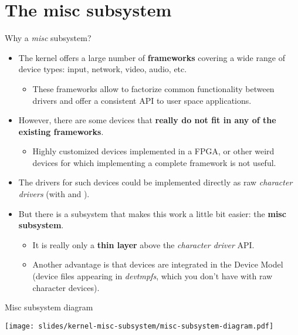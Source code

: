 \section{The misc subsystem}

\begin{frame}{Why a {\em misc} subsystem?}
  \begin{itemize}
  \item The kernel offers a large number of {\bf frameworks} covering
    a wide range of device types: input, network, video, audio,
    etc.
    \begin{itemize}
    \item These frameworks allow to factorize common functionality
      between drivers and offer a consistent API to user space
      applications.
    \end{itemize}
  \item However, there are some devices that {\bf really do not fit in any
    of the existing frameworks}.
    \begin{itemize}
    \item Highly customized devices implemented in a FPGA, or other
      weird devices for which implementing a complete framework is not
      useful.
    \end{itemize}
  \item The drivers for such devices could be implemented directly as
    raw {\em character drivers} (with  and
    ).
  \item But there is a subsystem that makes this work a little bit
    easier: the {\bf misc subsystem}.
    \begin{itemize}
    \item It is really only a {\bf thin layer} above the {\em character
        driver} API.
    \item Another advantage is that devices are integrated in the Device
        Model (device files appearing in {\em devtmpfs}, which you don't
	have with raw character devices).
    \end{itemize}
  \end{itemize}
\end{frame}

\begin{frame}{Misc subsystem diagram}
  \begin{center}
    \texttt{[image: slides/kernel-misc-subsystem/misc-subsystem-diagram.pdf]}
  \end{center}
\end{frame}

